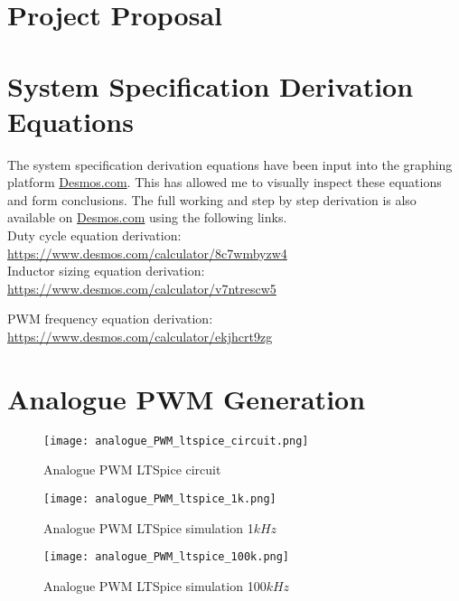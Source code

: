 \chapter{Project Proposal}\label{A:proposal}




\chapter{System Specification Derivation Equations} \label{A:specs}

The system specification derivation equations have been input into the graphing platform \url{Desmos.com}. This has allowed me to visually inspect these equations and form conclusions. The full working and step by step derivation is also available on \url{Desmos.com} using the following links.\\

Duty cycle equation derivation:\\
\url{https://www.desmos.com/calculator/8c7wmbyzw4}\\

Inductor sizing equation derivation:\\ 
\url{https://www.desmos.com/calculator/v7ntrescw5}

PWM frequency equation derivation:\\ 
\url{https://www.desmos.com/calculator/ekjhcrt9zg}

\chapter{Analogue PWM Generation} \label{A:analogue_PWM}


\begin{figure}[H]
    \texttt{[image: analogue\_PWM\_ltspice\_circuit.png]}
    \caption{Analogue PWM LTSpice circuit}
\end{figure}

\begin{figure}[H]
    \texttt{[image: analogue\_PWM\_ltspice\_1k.png]}
    \caption{Analogue PWM LTSpice simulation 1$kHz$}
\end{figure}

\begin{figure}[H]
    \texttt{[image: analogue\_PWM\_ltspice\_100k.png]}
    \caption{Analogue PWM LTSpice simulation 100$kHz$}
\end{figure}


